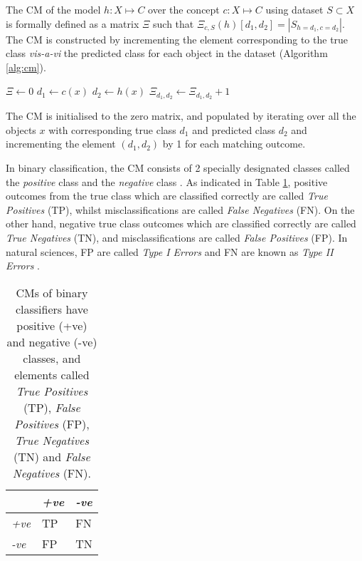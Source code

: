 The CM of the model $h : X \mapsto C$ over the concept $c : X \mapsto C$ using dataset $S \subset X$ is formally defined \citep{cichosz2014data} as a matrix $\Xi$ such that $\Xi_{c,S}(h)[d_1,d_2] = |S_{h=d_1,c=d_2}|$. The CM is constructed by incrementing the element corresponding to the true class \textit{vis-a-vi} the predicted class for each object in the dataset (Algorithm \ref{alg:cm}).

\begin{algorithm}
  \begin{algorithmic}
    \State $\Xi \gets 0$
      \State $d_1 \gets c(x)$
      \State $d_2 \gets h(x)$
      \State $\Xi_{d_1,d_2} \gets \Xi_{d_1,d_2} + 1$
    \EndFor
  \end{algorithmic}
  \caption{The CM is initialised to the zero matrix, and populated by iterating over all the objects $x$ with corresponding true class $d_1$ and predicted class $d_2$ and incrementing the element $(d_1,d_2)$ by 1 for each matching outcome.}
  \label{alg:cm}
\end{algorithm}

In binary classification, the CM consists of 2 specially designated classes called the \textit{positive} class and the \textit{negative} class \citep{saito2015precision}. As indicated in Table \ref{tab:cm_binary}, positive outcomes from the true class  which are classified correctly are called \textit{True Positives} (TP), whilst misclassifications are called \textit{False Negatives} (FN). On the other hand, negative true class outcomes which are classified correctly are called \textit{True Negatives} (TN), and misclassifications are called \textit{False Positives} (FP). In natural sciences, FP are called \textit{Type I Errors} and FN are known as \textit{Type II Errors} \citep{fielding1997review}.

\begin{table}[ht]
  \centering
  \selectfont
  \begin{tabular}{lll}
    \toprule
                  & \textit{+ve} & \textit{-ve} \\
    \midrule
    \textit{+ve}  & TP           & FN \\
    \textit{-ve}  & FP           & TN \\
    \bottomrule
  \end{tabular}
  \caption{CMs of binary classifiers have positive (+ve) and negative (-ve) classes, and elements called \textit{True Positives} (TP), \textit{False Positives} (FP), \textit{True Negatives} (TN) and \textit{False Negatives} (FN).}
  \label{tab:cm_binary}
\end{table}

